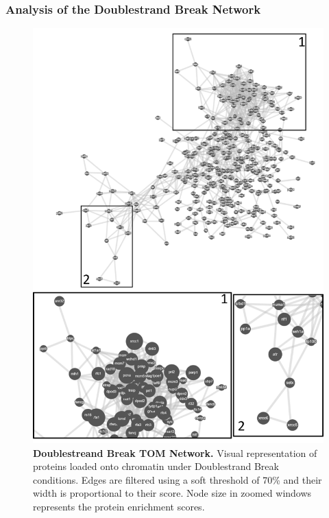 \subsubsection{Analysis of the Doublestrand Break Network}
\label{sec:dsbnet}
\begin{figure}[H]
    \centering
    \includegraphics[width=.8\textwidth]{resources/images/Results/DSB_networkplot.png}
    \caption[Doublestreand Break TOM Network]{\textbf{Doublestreand Break TOM Network. }Visual representation of proteins loaded onto chromatin under Doublestrand Break conditions. Edges are filtered using a soft threshold of 70\% and their width  is proportional to their score. Node size in zoomed windows represents the protein enrichment scores.}
    \label{fig:DSBtom}
\end{figure}
